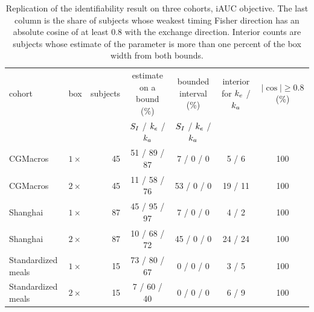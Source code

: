 \begin{table}[t]
\centering\footnotesize\setlength{\tabcolsep}{4pt}
\begin{tabular}{llrcccc}
\toprule
cohort & box & subjects & estimate on a bound (\%) & bounded interval (\%) & interior for $k_e$ / $k_a$ & $|\cos|\ge0.8$ (\%) \\
 & & & $S_I$ / $k_e$ / $k_a$ & $S_I$ / $k_e$ / $k_a$ & & \\
\midrule
CGMacros & $1\times$ & 45 & 51 / 89 / 87 & 7 / 0 / 0 & 5 / 6 & 100 \\
CGMacros & $2\times$ & 45 & 11 / 58 / 76 & 53 / 0 / 0 & 19 / 11 & 100 \\
Shanghai & $1\times$ & 87 & 45 / 95 / 97 & 7 / 0 / 0 & 4 / 2 & 100 \\
Shanghai & $2\times$ & 87 & 10 / 68 / 72 & 45 / 0 / 0 & 24 / 24 & 100 \\
Standardized meals & $1\times$ & 15 & 73 / 80 / 67 & 0 / 0 / 0 & 3 / 5 & 100 \\
Standardized meals & $2\times$ & 15 & 7 / 60 / 40 & 0 / 0 / 0 & 6 / 9 & 100 \\
\bottomrule
\end{tabular}
\caption{Replication of the identifiability result on three cohorts, iAUC objective. The last column is the share of subjects whose weakest timing Fisher direction has an absolute cosine of at least $0.8$ with the exchange direction. Interior counts are subjects whose estimate of the parameter is more than one percent of the box width from both bounds.}
\label{tab:cohortresults}
\end{table}
